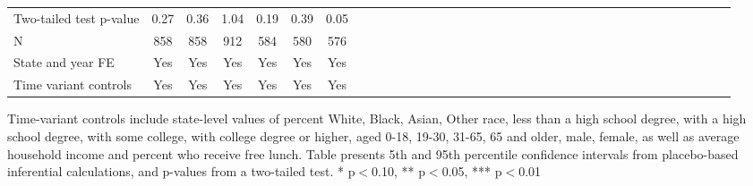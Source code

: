\begin{table}[htbp]
\begin{center}
\begin{threeparttable}
\begin{tabular}{l*{6}{c c c c c c}}
Two-tailed test p-value&        0.27   &        0.36   &        1.04   &        \cellcolor[cmyk]{0.2,0,0,0}  0.19   &       \cellcolor[cmyk]{0.2,0,0,0}   0.39   &      \cellcolor[cmyk]{0.2,0,0,0}    0.05   \\
N                   &         858   &         858   &         912   &         584   &         580   &         576   \\
\midrule
State and year FE                              & Yes   & Yes   & Yes   & Yes   & Yes   & Yes            \\
Time variant controls                  & Yes   & Yes   & Yes   & Yes   & Yes   & Yes            \\
\bottomrule
\end{tabular}
\begin{tablenotes}
\tiny
\item Time-variant controls include state-level values of percent White, Black, Asian, Other race, less than a high school degree, with a high school degree, with some college, with college degree or higher, aged 0-18, 19-30, 31-65, 65 and older, male, female, as well as average household income and percent who receive free lunch.  Table presents 5th and 95th percentile confidence intervals from placebo-based inferential calculations, and p-values from a two-tailed test. * p$<$0.10, ** p$<$0.05, *** p$<$0.01
\end{tablenotes}
\end{threeparttable}
\end{center}
\end{table}
